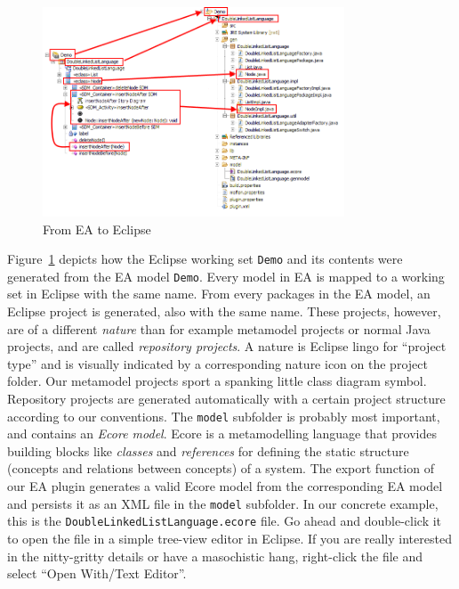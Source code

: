 \begin{figure}[!h]
	\centering
  \includegraphics[width=0.8\textwidth]{pics/installationAndSetup/bothexplorers}
	\caption{From EA to Eclipse}
	\label{fig_fromEAtoEclipse}
\end{figure}

Figure~\ref{fig_fromEAtoEclipse} depicts how the Eclipse working set
\texttt{Demo} and its contents were generated from the EA model \texttt{Demo}.
Every model in EA is mapped to a working set in Eclipse with the same name. 
From every packages in the EA model, an Eclipse project is generated, also with
the same name.  These projects, however, are of a different
\emph{nature} than for example metamodel projects or normal Java projects, and
are called \emph{repository projects}.  A nature is Eclipse lingo for ``project
type'' and is visually indicated by a corresponding nature icon on the project
folder.  Our  metamodel projects sport a spanking little class diagram symbol. 
Repository projects are generated automatically  with a certain project
structure according to our conventions.  The  \texttt{model} subfolder is
probably most important, and contains an  \emph{Ecore model}.  Ecore is a
metamodelling language that provides building  blocks like \emph{classes} and
\emph{references} for defining the  static structure (concepts and relations
between concepts) of a system.  The  export function of our EA plugin generates
a valid Ecore model from the  corresponding EA model and persists it as an XML
file in the \texttt{model}  subfolder.  In our concrete example, this is the
\texttt{DoubleLinkedListLanguage.ecore} file.  Go ahead and double-click it to
open the file in a simple tree-view editor in Eclipse.  If you are really
interested in the nitty-gritty details or have a masochistic hang, right-click
the file and select ``Open With/Text Editor''. 


